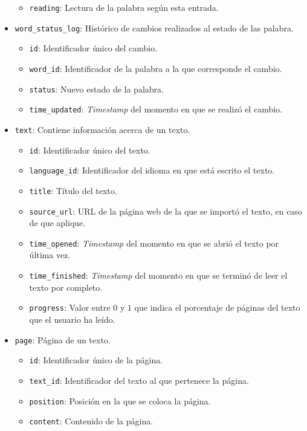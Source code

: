 \begin{itemize}
\begin{itemize}[label=$\star$]
		\item \texttt{reading}: Lectura de la palabra según esta entrada.
	\end{itemize}
	\item \texttt{word\_status\_log}: Histórico de cambios realizados al estado de las palabra.
	\begin{itemize}[label=$\star$]
		\item \texttt{id}: Identificador único del cambio.
		\item \texttt{word\_id}: Identificador de la palabra a la que corresponde el cambio.
		\item \texttt{status}: Nuevo estado de la palabra.
		\item \texttt{time\_updated}: \textit{Timestamp} del momento en que se realizó el cambio.
	\end{itemize}
	\item \texttt{text}: Contiene información acerca de un texto.
	\begin{itemize}[label=$\star$]
		\item \texttt{id}: Identificador único del texto.
		\item \texttt{language\_id}: Identificador del idioma en que está escrito el texto.
		\item \texttt{title}: Título del texto.
		\item \texttt{source\_url}: URL de la página web de la que se importó el texto, en caso de que aplique.
		\item \texttt{time\_opened}: \textit{Timestamp} del momento en que se abrió el texto por última vez.
		\item \texttt{time\_finished}: \textit{Timestamp} del momento en que se terminó de leer el texto por completo.
		\item \texttt{progress}: Valor entre $0$ y $1$ que indica el porcentaje de páginas del texto que el usuario ha leído.
	\end{itemize}
	\item \texttt{page}: Página de un texto.
	\begin{itemize}[label=$\star$]
		\item \texttt{id}: Identificador único de la página.
		\item \texttt{text\_id}: Identificador del texto al que pertenece la página.
		\item \texttt{position}: Posición en la que se coloca la página.
		\item \texttt{content}: Contenido de la página.
	\end{itemize}

\end{itemize}
